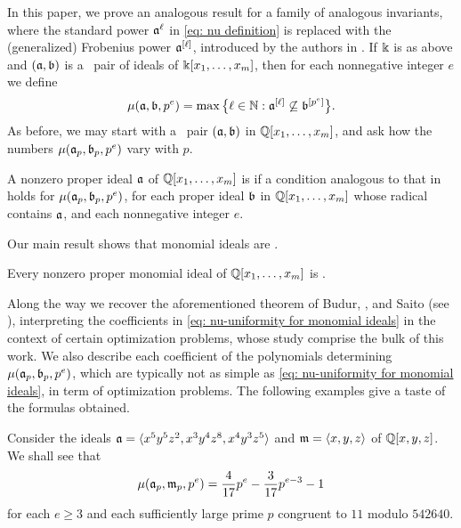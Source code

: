 \documentclass{article}
\begin{document}
In this paper, we prove an analogous result for a family of analogous invariants, where the standard power $\mathfrak{a}^\ell$ in \eqref{eq: nu definition} is replaced with the (generalized) Frobenius power $\mathfrak{a}^{[\ell]}$, introduced by the authors in \cite{hernandez+etal.frobenius_powers}.
If $\Bbbk$ is as above and $(\mathfrak{a},\mathfrak{b})$ is a \compatible\ pair of ideals of $\Bbbk[x_1, \ldots, x_m]$, then for each nonnegative integer $e$ we define
\[\mu(\mathfrak{a},\mathfrak{b},p^e) = \max\big\{\ell\in \mathbb{N} : \mathfrak{a}^{[\ell]} \not\subseteq \mathfrak{b}^{[p^e]}\big\}.\]
As before, we may start with a \compatible\ pair $(\mathfrak{a},\mathfrak{b})$ in $\mathbb{Q}[x_1,\ldots,x_m]$, and ask how the numbers $\mu(\mathfrak{a}_p,\mathfrak{b}_p,p^e)$ vary with $p$.

\begin{definition}
   \label{defn: muCool}
   A nonzero proper ideal $\mathfrak{a}$ of $\mathbb{Q}[x_1,\ldots,x_m]$ is \emph{\muCool} if a condition analogous to that in 
   holds for $\mu(\mathfrak{a}_p,\mathfrak{b}_p,p^e)$, for each proper ideal $\mathfrak{b}$ in $\mathbb{Q}[x_1,\ldots,x_m]$ whose radical contains $\mathfrak{a}$, and each nonnegative integer $e$.
\end{definition}

Our main result shows that monomial ideals are \muCool.
\begin{thmintro}[\textcolor{nicered}{ADD CROSS-REFERENCE}]
   \label{main theorem}
   Every nonzero proper monomial ideal of $\mathbb{Q}[x_1,\ldots,x_m]$ is \muCool.
\end{thmintro}

Along the way we recover the aforementioned theorem of Budur, \mustata, and Saito (see ), interpreting the coefficients in \eqref{eq: nu-uniformity for monomial ideals} in the context of certain optimization problems, whose study comprise the bulk of this work. 
We also describe each coefficient of the polynomials determining $\mu(\mathfrak{a}_p,\mathfrak{b}_p,p^e)$, which are typically not as simple as \eqref{eq: nu-uniformity for monomial ideals}, in term of optimization problems.
The following examples give a taste of the formulas obtained.

\begin{example}
   \label{ex1 intro}
   Consider the ideals $\mathfrak{a} = \langle x^5 y^5 z^2, x^3 y^4 z^8, x^4 y^3 z^5 \rangle$ and $\mathfrak{m} = \langle x,y,z \rangle$ of $\mathbb{Q}[x,y,z]$.
   We shall see that
   \[
      \mu(\mathfrak{a}_p,\mathfrak{m}_p,p^e) = \frac{4}{17}p^e - \frac{3}{17}p^{e-3}  - 1
    \]
    for each $e\ge 3$ and each sufficiently large prime $p$ congruent to $11$ modulo $\num{542640}$.
\end{example}
\end{document}
